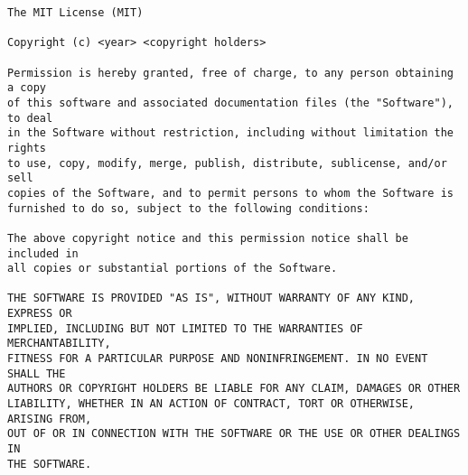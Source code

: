 \documentclass[a4paper, 12pt, oneside]{Thesis}  %
\begin{document}
\begin{verbatim}
The MIT License (MIT)

Copyright (c) <year> <copyright holders>

Permission is hereby granted, free of charge, to any person obtaining a copy
of this software and associated documentation files (the "Software"), to deal
in the Software without restriction, including without limitation the rights
to use, copy, modify, merge, publish, distribute, sublicense, and/or sell
copies of the Software, and to permit persons to whom the Software is
furnished to do so, subject to the following conditions:

The above copyright notice and this permission notice shall be included in
all copies or substantial portions of the Software.

THE SOFTWARE IS PROVIDED "AS IS", WITHOUT WARRANTY OF ANY KIND, EXPRESS OR
IMPLIED, INCLUDING BUT NOT LIMITED TO THE WARRANTIES OF MERCHANTABILITY,
FITNESS FOR A PARTICULAR PURPOSE AND NONINFRINGEMENT. IN NO EVENT SHALL THE
AUTHORS OR COPYRIGHT HOLDERS BE LIABLE FOR ANY CLAIM, DAMAGES OR OTHER
LIABILITY, WHETHER IN AN ACTION OF CONTRACT, TORT OR OTHERWISE, ARISING FROM,
OUT OF OR IN CONNECTION WITH THE SOFTWARE OR THE USE OR OTHER DEALINGS IN
THE SOFTWARE.
\end{verbatim}

\clearpage

\pagestyle{fancy}

\tableofcontents  %

\listoffigures  %

\listoftables  %

\clearpage  %
\end{document}
